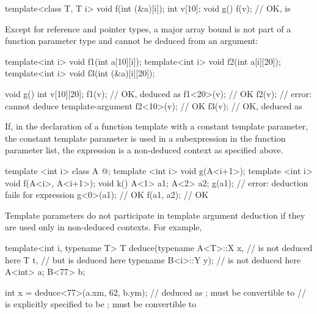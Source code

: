 \pnum
\begin{example}
\begin{codeblock}
template<class T, T i> void f(int (&a)[i]);
int v[10];
void g() {
  f(v);                         // OK,  is 
}
\end{codeblock}
\end{example}

\pnum
\begin{note}
Except for reference and pointer types, a major array bound is not part of a
function parameter type and cannot be deduced from an argument:
\begin{codeblock}
template<int i> void f1(int a[10][i]);
template<int i> void f2(int a[i][20]);
template<int i> void f3(int (&a)[i][20]);

void g() {
  int v[10][20];
  f1(v);                        // OK,  deduced as 
  f1<20>(v);                    // OK
  f2(v);                        // error: cannot deduce template-argument 
  f2<10>(v);                    // OK
  f3(v);                        // OK,  deduced as 
}
\end{codeblock}
\end{note}

\pnum
\begin{note}
If, in the declaration of a function template with a constant
template parameter, the constant template parameter
is used in a subexpression in the function parameter list,
the expression is a non-deduced context as specified above.
\begin{example}
\begin{codeblock}
template <int i> class A { @\commentellip@ };
template <int i> void g(A<i+1>);
template <int i> void f(A<i>, A<i+1>);
void k() {
  A<1> a1;
  A<2> a2;
  g(a1);                        // error: deduction fails for expression 
  g<0>(a1);                     // OK
  f(a1, a2);                    // OK
}
\end{codeblock}
\end{example}
\end{note}

\pnum
\begin{note}
Template parameters do not participate in template argument deduction if
they are used only in non-deduced contexts.
For example,

\begin{codeblock}
template<int i, typename T>
T deduce(typename A<T>::X x,    //  is not deduced here
         T t,                   // but  is deduced here
         typename B<i>::Y y);   //  is not deduced here
A<int> a;
B<77>  b;

int    x = deduce<77>(a.xm, 62, b.ym);
//  deduced as ;  must be convertible to 
//  is explicitly specified to be ;  must be convertible to 
\end{codeblock}
\end{note}

